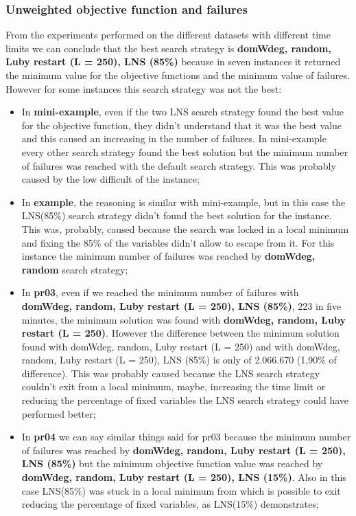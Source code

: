 \subsubsection{Unweighted objective function and failures}
From the experiments performed on the different datasets with different time limits we can conclude that the best search strategy is \textbf{domWdeg, random, Luby restart (L = 250), LNS (85\%)} because in seven instances it returned the minimum value for the objective functions and the minimum value of failures. However for some instances this search strategy was not the best:
\begin{itemize}
    \item In \textbf{mini-example}, even if the two LNS search strategy found the best value for the objective function, they didn't understand that it was the best value and this caused an increasing in the number of failures. In mini-example every other search strategy found the best solution but the minimum number of failures was reached with the default search strategy. This was probably caused by the low difficult of the instance;
    \item In \textbf{example}, the reasoning is similar with mini-example, but in this case the LNS(85\%) search strategy didn't found the best solution for the instance. This was, probably, caused because the search was locked in a local minimum and fixing the 85\% of the variables didn't allow to escape from it. For this instance the minimum number of failures was reached by \textbf{domWdeg, random} search strategy;
    \item In \textbf{pr03}, even if we reached the minimum number of failures with \textbf{domWdeg, random, Luby restart (L = 250), LNS (85\%)}, 223 in five minutes, the minimum solution was found with \textbf{domWdeg, random, Luby restart (L = 250)}. However the difference between the minimum solution found with domWdeg, random, Luby restart (L = 250) and with domWdeg, random, Luby restart (L = 250), LNS (85\%) is only of 2.066.670 (1,90\% of difference). This was probably caused because the LNS search strategy couldn't exit from a local minimum, maybe, increasing the time limit or reducing the percentage of fixed variables the LNS search strategy could have performed better;
    \item In \textbf{pr04} we can say similar things said for pr03 because the minimum number of failures was reached by \textbf{domWdeg, random, Luby restart (L = 250), LNS (85\%)} but the minimum objective function value was reached by \textbf{domWdeg, random, Luby restart (L = 250), LNS (15\%)}. Also in this case LNS(85\%) was stuck in a local minimum from which is possible to exit reducing the percentage of fixed variables, as LNS(15\%) demonstrates;

\end{itemize}
